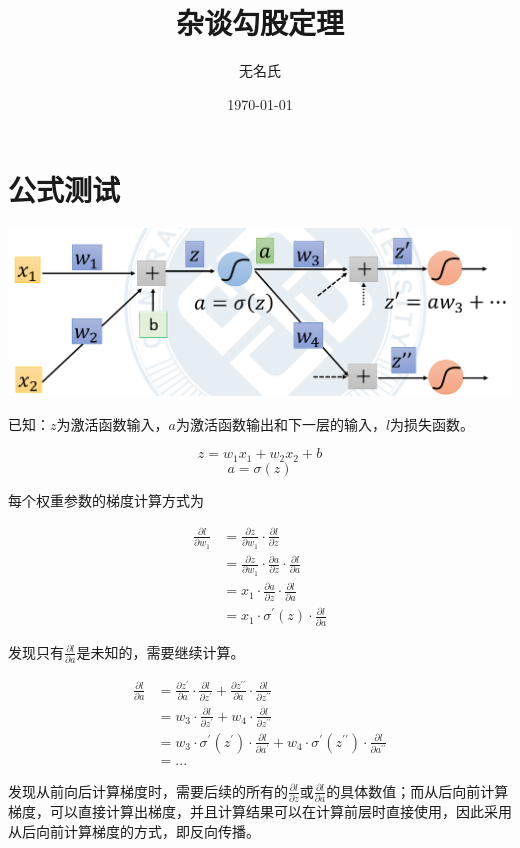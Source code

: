 \documentclass[12pt]{ctexart}
\title{杂谈勾股定理}
\author{无名氏}
\date{\today}
\begin{document}
\maketitle
\section{公式测试}

\newpage
\centering  
\includegraphics[width=\textwidth]{1.png} 
\label{fig:my_label}

已知：$z$为激活函数输入，$a$为激活函数输出和下一层的输入，$l$为损失函数。

$$z=w_1x_1+w_2x_2+b$$
$$a=\sigma (z)$$

每个权重参数的梯度计算方式为

\begin{equation}
    \begin{aligned}
        \frac{\partial l}{\partial w_1} &= \frac{\partial z}{\partial w_1} \cdot \frac{\partial l}{\partial z}\\
        &=\frac{\partial z}{\partial w_1} \cdot \frac{\partial a}{\partial z} \cdot \frac{\partial l}{\partial a}\\
        &=x_1 \cdot \frac{\partial a}{\partial z} \cdot \frac{\partial l}{\partial a}\\
        &=x_1 \cdot \sigma^\prime (z) \cdot \frac{\partial l}{\partial a}
    \end{aligned}
\end{equation}

发现只有$\frac{\partial l}{\partial a}$是未知的，需要继续计算。

\begin{equation}
    \begin{aligned}
        \frac{\partial l}{\partial a} &= \frac{\partial z^\prime}{\partial a} \cdot \frac{\partial l}{\partial z^\prime} 
        + \frac{\partial z^{\prime\prime}}{\partial a} \cdot \frac{\partial l}{\partial z^{\prime\prime}} 
        \\
        &= w_3 \cdot \frac{\partial l}{\partial z^\prime} + w_4 \cdot \frac{\partial l}{\partial z^{\prime\prime}}\\
        &= w_3 \cdot \sigma^\prime (z^\prime) \cdot \frac{\partial l}{\partial a^\prime} + w_4 \cdot \sigma^\prime (z^{\prime\prime}) \cdot  \frac{\partial l}{\partial a^{\prime\prime}}\\
        &= ...
    \end{aligned}
\end{equation}

\flushleft
发现从前向后计算梯度时，需要后续的所有的$\frac{\partial l}{\partial z}$或$\frac{\partial l}{\partial a}$的具体数值；而从后向前计算梯度，可以直接计算出梯度，并且计算结果可以在计算前层时直接使用，因此采用从后向前计算梯度的方式，即反向传播。


\end{document}
